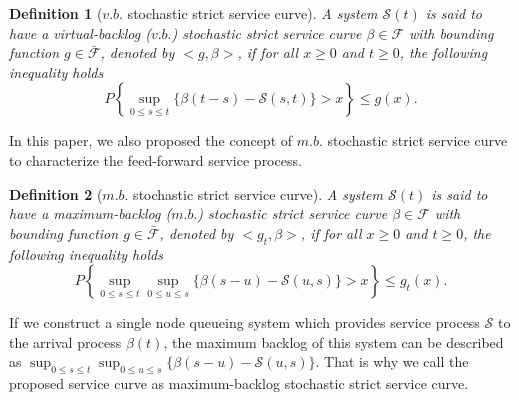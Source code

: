 \documentclass[12pt]{article}
\newtheorem{definition}{Definition}
\begin{document}
\begin{definition}[$v.b.$ stochastic strict service curve]
A system $\mathcal{S}(t)$ is said to have a virtual-backlog ($v.b.$) stochastic strict service curve $\beta\in\mathcal{F}$ with bounding function $g\in\bar{\mathcal{F}}$, denoted by $<g,\beta>$, if for all $x\geq 0$ and $t\geq 0$, the following inequality holds
$$P\left\{\sup_{0\leq s\leq t}\{\beta(t-s)-\mathcal{S}(s,t)\}>x\right\}\leq g(x).$$
\end{definition}

In this paper, we also proposed the concept of $m.b.$ stochastic strict service curve to characterize the feed-forward service process.
\begin{definition}[$m.b.$ stochastic strict service curve]
A system $\mathcal{S}(t)$ is said to have a maximum-backlog ($m.b.$) stochastic strict service curve $\beta\in\mathcal{F}$ with bounding function $g\in\bar{\mathcal{F}}$, denoted by $<g_t,\beta>$, if for all $x\geq 0$ and $t\geq 0$, the following inequality holds
$$P\left\{\sup_{0\leq s\leq t}\sup_{0\leq u\leq s}\{\beta(s-u)-\mathcal{S}(u,s)\}>x\right\}\leq g_t(x).$$
\end{definition}

If we construct a single node queueing system which provides service process $\mathcal{S}$ to the arrival process $\beta(t)$, the maximum backlog of this system can be described as $\sup_{0\leq s\leq t}\sup_{0\leq u\leq s}\{\beta(s-u)-\mathcal{S}(u,s)\}$. That is why we call the proposed service curve as maximum-backlog stochastic strict service curve.
\end{document}
